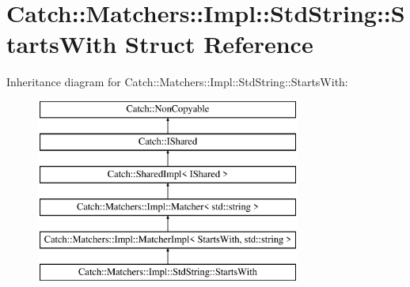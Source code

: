 \hypertarget{struct_catch_1_1_matchers_1_1_impl_1_1_std_string_1_1_starts_with}{\section{Catch\-:\-:Matchers\-:\-:Impl\-:\-:Std\-String\-:\-:Starts\-With Struct Reference}
\label{struct_catch_1_1_matchers_1_1_impl_1_1_std_string_1_1_starts_with}
}
Inheritance diagram for Catch\-:\-:Matchers\-:\-:Impl\-:\-:Std\-String\-:\-:Starts\-With\-:\begin{figure}[H]
\begin{center}
\leavevmode
\includegraphics[height=6.000000cm]{struct_catch_1_1_matchers_1_1_impl_1_1_std_string_1_1_starts_with}
\end{center}
\end{figure}

